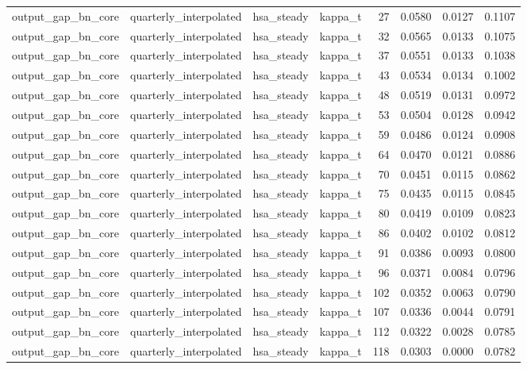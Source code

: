 \begin{tabular}{llllrrrr}
output\_gap\_bn\_core & quarterly\_interpolated & hsa\_steady & kappa\_t & 27 & 0.0580 & 0.0127 & 0.1107 \\
output\_gap\_bn\_core & quarterly\_interpolated & hsa\_steady & kappa\_t & 32 & 0.0565 & 0.0133 & 0.1075 \\
output\_gap\_bn\_core & quarterly\_interpolated & hsa\_steady & kappa\_t & 37 & 0.0551 & 0.0133 & 0.1038 \\
output\_gap\_bn\_core & quarterly\_interpolated & hsa\_steady & kappa\_t & 43 & 0.0534 & 0.0134 & 0.1002 \\
output\_gap\_bn\_core & quarterly\_interpolated & hsa\_steady & kappa\_t & 48 & 0.0519 & 0.0131 & 0.0972 \\
output\_gap\_bn\_core & quarterly\_interpolated & hsa\_steady & kappa\_t & 53 & 0.0504 & 0.0128 & 0.0942 \\
output\_gap\_bn\_core & quarterly\_interpolated & hsa\_steady & kappa\_t & 59 & 0.0486 & 0.0124 & 0.0908 \\
output\_gap\_bn\_core & quarterly\_interpolated & hsa\_steady & kappa\_t & 64 & 0.0470 & 0.0121 & 0.0886 \\
output\_gap\_bn\_core & quarterly\_interpolated & hsa\_steady & kappa\_t & 70 & 0.0451 & 0.0115 & 0.0862 \\
output\_gap\_bn\_core & quarterly\_interpolated & hsa\_steady & kappa\_t & 75 & 0.0435 & 0.0115 & 0.0845 \\
output\_gap\_bn\_core & quarterly\_interpolated & hsa\_steady & kappa\_t & 80 & 0.0419 & 0.0109 & 0.0823 \\
output\_gap\_bn\_core & quarterly\_interpolated & hsa\_steady & kappa\_t & 86 & 0.0402 & 0.0102 & 0.0812 \\
output\_gap\_bn\_core & quarterly\_interpolated & hsa\_steady & kappa\_t & 91 & 0.0386 & 0.0093 & 0.0800 \\
output\_gap\_bn\_core & quarterly\_interpolated & hsa\_steady & kappa\_t & 96 & 0.0371 & 0.0084 & 0.0796 \\
output\_gap\_bn\_core & quarterly\_interpolated & hsa\_steady & kappa\_t & 102 & 0.0352 & 0.0063 & 0.0790 \\
output\_gap\_bn\_core & quarterly\_interpolated & hsa\_steady & kappa\_t & 107 & 0.0336 & 0.0044 & 0.0791 \\
output\_gap\_bn\_core & quarterly\_interpolated & hsa\_steady & kappa\_t & 112 & 0.0322 & 0.0028 & 0.0785 \\
output\_gap\_bn\_core & quarterly\_interpolated & hsa\_steady & kappa\_t & 118 & 0.0303 & 0.0000 & 0.0782 \\

\end{tabular}

